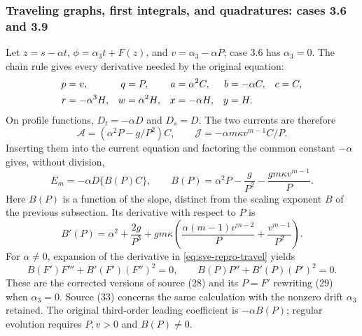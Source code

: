 \subsubsection{Traveling graphs, first integrals, and quadratures: cases 3.6 and 3.9}

Let $z=s-\alpha t$, $\phi=\alpha_3t+F(z)$, and
$v=\alpha_3-\alpha P$; case 3.6 has $\alpha_3=0$.
The chain rule gives every derivative needed by the original equation:
\begin{align}
 p&=v,&q&=P,&a&=\alpha^2C,&b&=-\alpha C,&c&=C,\notag\\
 r&=-\alpha^3H,&w&=\alpha^2H,&x&=-\alpha H,&y&=H.
 \label{eq:sve-travel-jets}
\end{align}
On profile functions, $D_t=-\alpha D$ and $D_s=D$. The two currents
are therefore
\[
 \mathcal A=(\alpha^2P-g/P^2)C,\qquad
 \mathcal J=-\alpha m\kappa v^{m-1}C/P.
\]
Inserting them into the current equation and factoring the common
constant $-\alpha$ gives, without division,
\begin{equation}
 E_m=-\alpha D\{B(P)C\},\qquad
 B(P)=\alpha^2P-\frac g{P^2}-\frac{gm\kappa v^{m-1}}P.
 \label{eq:sve-repro-travel}
\end{equation}
Here $B(P)$ is a function of the slope, distinct from the scaling exponent
$B$ of the previous subsection. Its derivative with respect to $P$ is
\begin{equation}
 B'(P)=\alpha^2+\frac{2g}{P^3}
    +gm\kappa\left(\frac{\alpha(m-1)v^{m-2}}P
                         +\frac{v^{m-1}}{P^2}\right).
 \label{eq:sve-travel-Bprime}
\end{equation}
For $\alpha\ne0$, expansion of the derivative in
\eqref{eq:sve-repro-travel} yields
\begin{equation}
 B(F')F'''+B'(F')(F'')^2=0,
 \qquad B(P)P''+B'(P)(P')^2=0.
 \label{eq:sve-travel-orders}
\end{equation}
These are the corrected versions of source (28) and its
$P=F'$ rewriting (29) when $\alpha_3=0$. Source (33) concerns the same
calculation with the nonzero drift $\alpha_3$ retained. The original
third-order leading coefficient is $-\alpha B(P)$; regular evolution
requires $P,v>0$ and $B(P)\ne0$.

